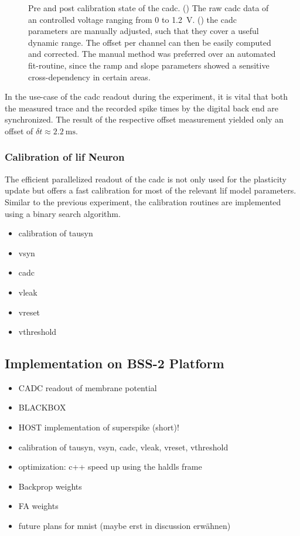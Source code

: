 \begin{figure}
\begin{subfigure}{0.5\textwidth}
		\label{postcadccalib}
	\end{subfigure}
	\caption[Pre and post calibration state of the \gls{cadc}]{Pre and post calibration state of the \gls{cadc}. () The raw cadc data of an controlled voltage ranging from 0 to \SI{1.2}{\V}. () the cadc parameters are manually adjusted, such that they cover a useful dynamic range. The offset per channel can then be easily computed and corrected. The manual method was preferred over an automated fit-routine, since the ramp and slope parameters showed a sensitive cross-dependency in certain areas.}
	\label{cadccalibration}
\end{figure}

In the use-case of the \gls{cadc} readout during the experiment, it is vital that both the measured trace and the recorded spike times by the digital back end are synchronized. The result of the respective offset measurement yielded only an offset of $\delta t \approx \SI{2.2}{\milli \s}$.


\subsubsection*{Calibration of \gls{lif} Neuron}

The efficient parallelized readout of the \gls{cadc} is not only used for the plasticity update but offers a fast calibration for most of the relevant \gls{lif} model parameters. Similar to the previous experiment, the calibration routines are implemented using a binary search algorithm. 

\begin{itemize}
	\item calibration of tausyn
	\item vsyn
	\item cadc
	\item vleak
	\item vreset
	\item vthreshold
\end{itemize}



\subsection{Implementation on BSS-2 Platform}
\begin{itemize}
	\item CADC readout of membrane potential
	\item BLACKBOX
	\item HOST implementation of superspike (short)!
	\item calibration of tausyn, vsyn, cadc, vleak, vreset, vthreshold
	\item optimization: c++ speed up using the haldls frame
	\item Backprop weights
	\item FA weights
	\item future plans for mnist (maybe erst in discussion erwähnen)
\end{itemize}
	

